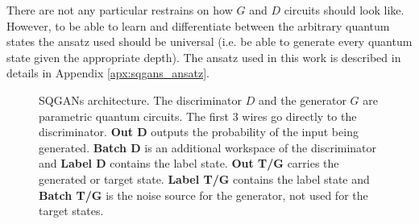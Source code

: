 There are not any particular restrains on how $G$ and $D$ circuits should look
like. However, to be able to learn and differentiate between the arbitrary quantum
states the ansatz used should be universal (i.e. be able to generate every
quantum state given the appropriate depth). The ansatz used in this
work is described in details in Appendix \ref{apx:sqgans_ansatz}.

\begin{figure}[htbp!]
  \caption{SQGANs architecture. The discriminator $D$ and the generator $G$ are
    parametric quantum circuits. The first 3 wires go
    directly to the discriminator. \textbf{Out D} outputs the probability of the
  input being generated. \textbf{Batch D} is an additional workspace of the
  discriminator and \textbf{Label D} contains the label state. \textbf{Out T/G}
  carries the generated or target state. \textbf{Label T/G} contains the label
  state and \textbf{Batch T/G} is the noise source for the generator, not used
  for the target states.\label{fig:SQGANs_circuit} }
\end{figure}

